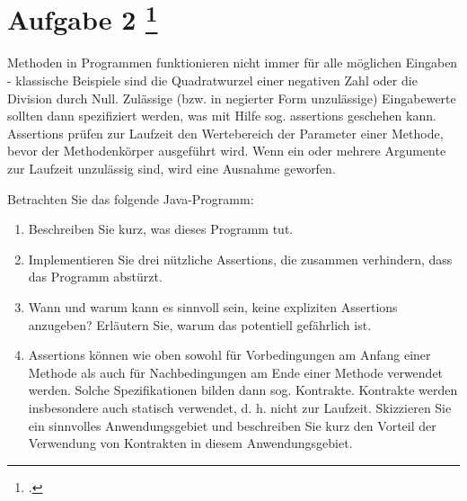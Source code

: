 \documentclass{lehramt-informatik-aufgabe}
\begin{document}
\section{Aufgabe 2
\index{}
\footcite{examen:66116:2019:09}}

Methoden in Programmen funktionieren nicht immer für alle möglichen
Eingaben - klassische Beispiele sind die Quadratwurzel einer negativen
Zahl oder die Division durch Null. Zulässige (bzw. in negierter Form
unzulässige) Eingabewerte sollten dann spezifiziert werden, was mit
Hilfe sog. assertions geschehen kann. Assertions prüfen zur Laufzeit den
Wertebereich der Parameter einer Methode, bevor der Methodenkörper
ausgeführt wird. Wenn ein oder mehrere Argumente zur Laufzeit unzulässig
sind, wird eine Ausnahme geworfen.


Betrachten Sie das folgende Java-Programm:

\begin{enumerate}


\item Beschreiben Sie kurz, was dieses Programm tut.


\item Implementieren Sie drei nützliche Assertions, die zusammen
verhindern, dass das Programm abstürzt.


\item Wann und warum kann es sinnvoll sein, keine expliziten Assertions
anzugeben? Erläutern Sie, warum das potentiell gefährlich ist.


\item Assertions können wie oben sowohl für Vorbedingungen am Anfang
einer Methode als auch für Nachbedingungen am Ende einer Methode
verwendet werden. Solche Spezifikationen bilden dann sog. Kontrakte.
Kontrakte werden insbesondere auch statisch verwendet, d. h. nicht zur
Laufzeit. Skizzieren Sie ein sinnvolles Anwendungsgebiet und beschreiben
Sie kurz den Vorteil der Verwendung von Kontrakten in diesem
Anwendungsgebiet.

\end{enumerate}
\end{document}
